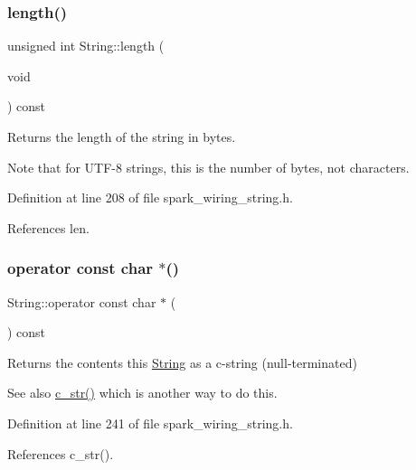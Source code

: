 \subsubsection{\texorpdfstring{length()}{length()}}
{\footnotesize\ttfamily unsigned int String\+::length (\begin{DoxyParamCaption}\item[{void}]{ }\end{DoxyParamCaption}) const\hspace{0.3cm}{\ttfamily [inline]}}



Returns the length of the string in bytes. 

Note that for U\+T\+F-\/8 strings, this is the number of bytes, not characters. 

Definition at line 208 of file spark\+\_\+wiring\+\_\+string.\+h.



References len.

\mbox{\label{class_string_a9a12caedc885ac44c86d104a8cb60f82}} 
\subsubsection{\texorpdfstring{operator const char $\ast$()}{operator const char *()}}
{\footnotesize\ttfamily String\+::operator const char $\ast$ (\begin{DoxyParamCaption}{ }\end{DoxyParamCaption}) const\hspace{0.3cm}{\ttfamily [inline]}}



Returns the contents this \hyperlink{class_string}{String} as a c-\/string (null-\/terminated) 

See also \hyperlink{class_string_a0274f3e61533d15086816fb7f47ccb54}{c\+\_\+str()} which is another way to do this. 

Definition at line 241 of file spark\+\_\+wiring\+\_\+string.\+h.



References c\+\_\+str().

\mbox{\label{class_string_aa15ca61ec96c4068e07c23fea25625fa}} 

